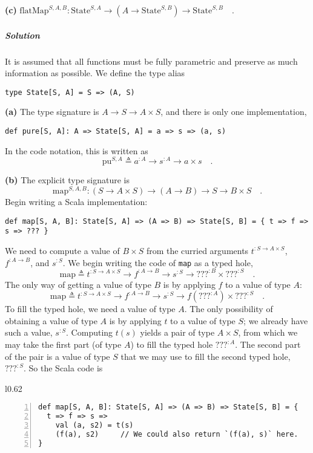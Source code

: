 \textbf{(c)} $\text{flatMap}^{S,A,B}:\text{State}^{S,A}\rightarrow(A\rightarrow\text{State}^{S,B})\rightarrow\text{State}^{S,B}\quad.$

\subparagraph{Solution}

It is assumed that all functions must be fully parametric and preserve
as much information as possible. We define the type alias
\begin{lstlisting}
type State[S, A] = S => (A, S)
\end{lstlisting}

\textbf{(a)} The type signature is $A\rightarrow S\rightarrow A\times S$,
and there is only one implementation,
\begin{lstlisting}
def pure[S, A]: A => State[S, A] = a => s => (a, s)
\end{lstlisting}
In the code notation, this is written as
\[
\text{pu}^{S,A}\triangleq a^{:A}\rightarrow s^{:A}\rightarrow a\times s\quad.
\]

\textbf{(b)} The explicit type signature is 
\[
\text{map}^{S,A,B}:(S\rightarrow A\times S)\rightarrow(A\rightarrow B)\rightarrow S\rightarrow B\times S\quad.
\]
Begin writing a Scala implementation:
\begin{lstlisting}
def map[S, A, B]: State[S, A] => (A => B) => State[S, B] = { t => f => s => ??? }
\end{lstlisting}
We need to compute a value of $B\times S$ from the curried arguments
$t^{:S\rightarrow A\times S}$, $f^{:A\rightarrow B}$, and $s^{:S}$.
We begin writing the code of \lstinline!map! as a typed hole,
\[
\text{map}\triangleq t^{:S\rightarrow A\times S}\rightarrow f^{:A\rightarrow B}\rightarrow s^{:S}\rightarrow\text{???}^{:B}\times\text{???}^{:S}\quad.
\]
The only way of getting a value of type $B$ is by applying $f$ to
a value of type $A$:
\[
\text{map}\triangleq t^{:S\rightarrow A\times S}\rightarrow f^{:A\rightarrow B}\rightarrow s^{:S}\rightarrow f(\text{???}^{:A})\times\text{???}^{:S}\quad.
\]
To fill the typed hole, we need a value of type $A$. The only possibility
of obtaining a value of type $A$ is by applying $t$ to a value of
type $S$; we already have such a value, $s^{:S}$. Computing $t(s)$
yields a pair of type $A\times S$, from which we may take the first
part (of type $A$) to fill the typed hole $\text{???}^{:A}$. The
second part of the pair is a value of type $S$ that we may use to
fill the second typed hole, $\text{???}^{:S}$. So the Scala code
is

\begin{wrapfigure}{l}{0.62\columnwidth}%
\vspace{-0.8\baselineskip}
\begin{lstlisting}[numbers=left,numberstyle={\small}]
def map[S, A, B]: State[S, A] => (A => B) => State[S, B] = {
  t => f => s =>
    val (a, s2) = t(s)
    (f(a), s2)     // We could also return `(f(a), s)` here.
}
\end{lstlisting}
\vspace{-1.25\baselineskip}
\end{wrapfigure}%

